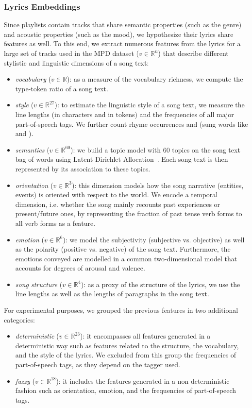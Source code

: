 \subsubsection{Lyrics Embeddings}
\label{sec:lyrics}
Since playlists contain tracks that share semantic properties (such as the genre) and acoustic properties (such as the mood), we hypothesize their lyrics share features as well. To this end, we extract numerous features from the lyrics for a large set of tracks used in the MPD dataset ($v \in \mathbb{R}^{n}$) that describe different stylistic and linguistic dimensions of a song text:
\begin{itemize}
  \item \textit{vocabulary} ($v \in \mathbb{R}$): as a measure of the vocabulary richness, we compute the type-token ratio of a song text.
  \item \textit{style} ($v \in \mathbb{R}^{27}$): to estimate the linguistic style of a song text, we measure the line lengths (in characters and in tokens) and the frequencies of all major part-of-speech tags. We further count rhyme occurrences and  (sung words like  and ).
  \item \textit{semantics} ($v \in \mathbb{R}^{60}$): we build a topic model with 60 topics on the song text bag of words using Latent Dirichlet Allocation~\cite{LDA}. Each song text is then represented by its association to these topics.
  \item \textit{orientation} ($v \in \mathbb{R}^{3}$): this dimension models how the song narrative (entities, events) is oriented with respect to the world. We encode a temporal dimension, i.e. whether the song mainly recounts past experiences or present/future ones, by representing the fraction of past tense verb forms to all verb forms as a feature.
  \item \textit{emotion} ($v \in \mathbb{R}^{6}$): we model the subjectivity (subjective vs. objective) as well as the polarity (positive vs. negative) of the song text. Furthermore, the emotions conveyed are modelled in a common two-dimensional model that accounts for degrees of arousal and valence.
  \item \textit{song structure} ($v \in \mathbb{R}^{4}$): as a proxy of the structure of the lyrics, we use the line lengths as well as the lengths of paragraphs in the song text.
\end{itemize}

For experimental purposes, we grouped the previous features in two additional categories:
\begin{itemize}
    \item \textit{deterministic} ($v \in \mathbb{R}^{23}$): it encompasses all features generated in a deterministic way such as features related to the structure, the vocabulary, and the style of the lyrics. We excluded from this group the frequencies of part-of-speech tags, as they depend on the tagger used.
    \item \textit{fuzzy} ($v \in \mathbb{R}^{18}$): it includes the features generated in a non-deterministic fashion such as orientation, emotion, and the frequencies of part-of-speech tags.
\end{itemize}

